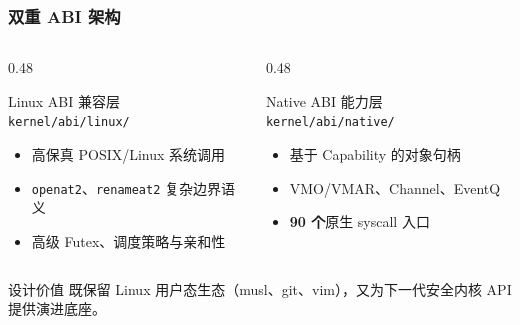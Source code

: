 \documentclass[aspectratio=1610]{beamer}
\newcommand{\code}[1]{\texttt{\footnotesize #1}}
\newcommand{\high}[1]{\textbf{\textcolor{ThemeColor}{#1}}}
\begin{document}
\begin{frame}
    \frametitle{双重 ABI 架构}
    \begin{columns}
        \begin{column}{0.48\textwidth}
            \begin{alertblock}{Linux ABI 兼容层}
                \code{kernel/abi/linux/}
                \begin{itemize}
                    \item 高保真 POSIX/Linux 系统调用
                    \item \code{openat2}、\code{renameat2} 复杂边界语义
                    \item 高级 Futex、调度策略与亲和性
                \end{itemize}
            \end{alertblock}
        \end{column}
        \begin{column}{0.48\textwidth}
            \begin{exampleblock}{Native ABI 能力层}
                \code{kernel/abi/native/}
                \begin{itemize}
                    \item 基于 Capability 的对象句柄
                    \item VMO/VMAR、Channel、EventQ
                    \item \high{90 个}原生 syscall 入口
                \end{itemize}
            \end{exampleblock}
        \end{column}
    \end{columns}
    \vspace{0.5em}
    \begin{block}{设计价值}
        既保留 Linux 用户态生态（musl、git、vim），又为下一代安全内核 API 提供演进底座。
    \end{block}
\end{frame}
\end{document}
